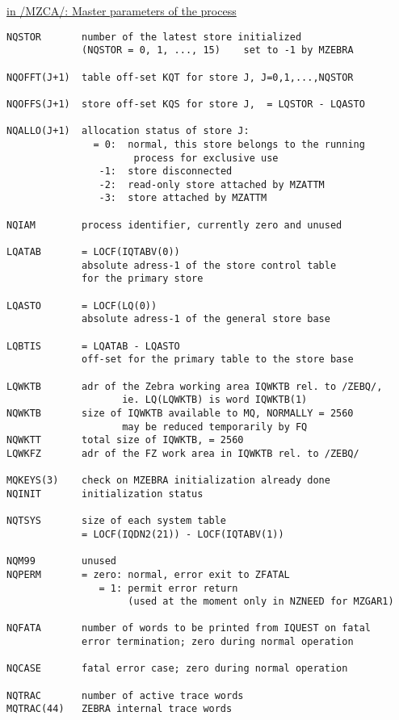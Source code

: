 \begin{flushright} \ul{\large in /MZCA/:  Master parameters of the process}
\end{flushright}
\begin{verbatim}
NQSTOR       number of the latest store initialized
             (NQSTOR = 0, 1, ..., 15)    set to -1 by MZEBRA

NQOFFT(J+1)  table off-set KQT for store J, J=0,1,...,NQSTOR

NQOFFS(J+1)  store off-set KQS for store J,  = LQSTOR - LQASTO

NQALLO(J+1)  allocation status of store J:
               = 0:  normal, this store belongs to the running
                      process for exclusive use
                -1:  store disconnected
                -2:  read-only store attached by MZATTM
                -3:  store attached by MZATTM

NQIAM        process identifier, currently zero and unused

LQATAB       = LOCF(IQTABV(0))
             absolute adress-1 of the store control table
             for the primary store

LQASTO       = LOCF(LQ(0))
             absolute adress-1 of the general store base

LQBTIS       = LQATAB - LQASTO
             off-set for the primary table to the store base

LQWKTB       adr of the Zebra working area IQWKTB rel. to /ZEBQ/,
                    ie. LQ(LQWKTB) is word IQWKTB(1)
NQWKTB       size of IQWKTB available to MQ, NORMALLY = 2560
                    may be reduced temporarily by FQ
NQWKTT       total size of IQWKTB, = 2560
LQWKFZ       adr of the FZ work area in IQWKTB rel. to /ZEBQ/

MQKEYS(3)    check on MZEBRA initialization already done
NQINIT       initialization status

NQTSYS       size of each system table
             = LOCF(IQDN2(21)) - LOCF(IQTABV(1))

NQM99        unused
NQPERM       = zero: normal, error exit to ZFATAL
                = 1: permit error return
                     (used at the moment only in NZNEED for MZGAR1)

NQFATA       number of words to be printed from IQUEST on fatal
             error termination; zero during normal operation

NQCASE       fatal error case; zero during normal operation

NQTRAC       number of active trace words
MQTRAC(44)   ZEBRA internal trace words
\end{verbatim} 

